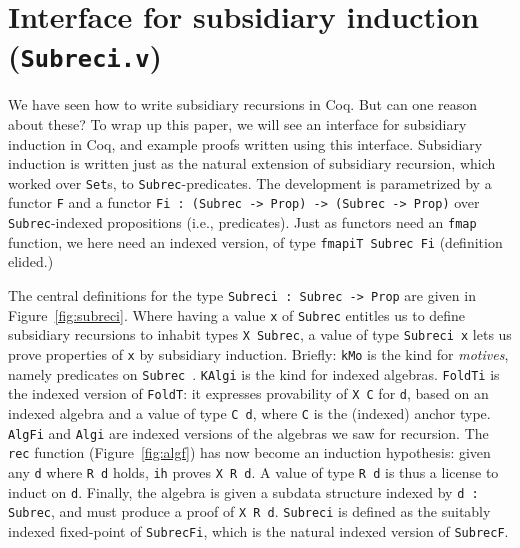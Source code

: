 \documentclass[a4paper,USenglish]{lipics-v2021}
\begin{document}
\section{Interface for subsidiary induction (\texttt{Subreci.v})}
\label{sec:interfacei}

We have seen how to write subsidiary recursions in Coq.  But can one
reason about these?  To wrap up this paper, we will see an interface
for subsidiary induction in Coq, and example proofs written using this
interface.  Subsidiary induction is written just as the natural
extension of subsidiary recursion, which worked over \verb|Set|s, to
\verb|Subrec|-predicates.  The development is parametrized by a
functor \verb|F| and a functor
\verb|Fi : (Subrec -> Prop) -> (Subrec -> Prop)| over
\verb|Subrec|-indexed propositions (i.e., predicates).  Just as
functors need an \verb|fmap| function, we here need an indexed
version, of type \verb|fmapiT Subrec Fi| (definition elided.)

The central definitions for the type \verb|Subreci : Subrec -> Prop|
are given in Figure~\ref{fig:subreci}.  Where having a value \verb|x|
of \verb|Subrec| entitles us to define subsidiary recursions to
inhabit types \verb|X Subrec|, a value of type \verb|Subreci x| lets
us prove properties of \verb|x| by subsidiary induction.  Briefly:
\verb|kMo| is the kind for \emph{motives}, namely predicates on
\verb|Subrec|~\cite{mcbride00}.  \verb|KAlgi| is the kind for indexed
algebras.  \verb|FoldTi| is the indexed version of \verb|FoldT|: it 
expresses provability of \verb|X C| for \verb|d|, based on an indexed
algebra and a value of type \verb|C d|, where \verb|C| is the (indexed) anchor
type.  \verb|AlgFi| and \verb|Algi| are indexed versions
of the algebras we saw for recursion.  The \verb|rec| function
(Figure~\ref{fig:algf}) has now become an induction hypothesis: given
any \verb|d| where \verb|R d| holds, \verb|ih| proves \verb|X R d|.  A
value of type \verb|R d| is thus a license to induct on \verb|d|.
Finally, the algebra is given a subdata structure indexed by
\verb|d : Subrec|, and must produce a proof of \verb|X R d|.  \verb|Subreci|
is defined as the suitably indexed fixed-point of \verb|SubrecFi|, which
is the natural indexed version of \verb|SubrecF|.
\end{document}
